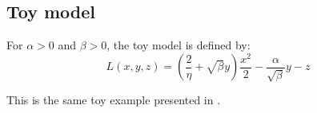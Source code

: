 \documentclass{article}
\begin{document}
\subsection{Toy model}

For $\alpha>0$ and $\beta>0$, the toy model is defined by:
\begin{equation*}
    L(x,y,z)=\left( \frac{2}{\eta}+\sqrt{\beta}y \right)\frac{x^2}{2}-\frac{\alpha}{\sqrt{\beta}}y-z
\end{equation*}

This is the same toy example presented in \citep{damian_selfstab}.




\label{app:exp_details}


% 
\end{document}
